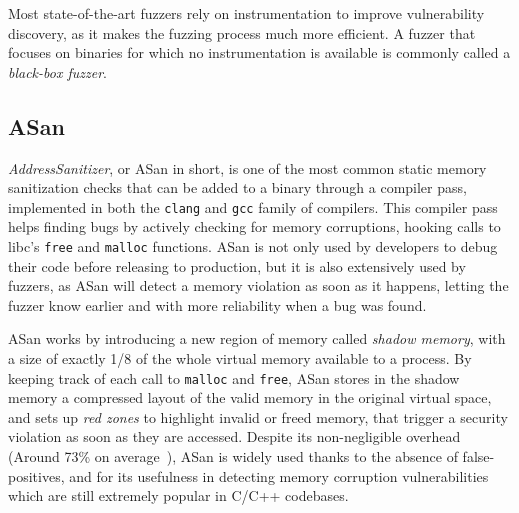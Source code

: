 \documentclass[a4paper,11pt,oneside]{report}
\begin{document}
Most state-of-the-art fuzzers rely on instrumentation to improve vulnerability 
discovery, as it makes the fuzzing process much more efficient. A fuzzer that 
focuses on binaries for which no instrumentation is available is commonly 
called a \emph{black-box fuzzer}. 

\subsection{ASan}
\emph{AddressSanitizer}, or ASan in short, is one of the most common static 
memory sanitization checks that can be added to a binary through a compiler 
pass, implemented in both the \texttt{clang} and \texttt{gcc} family of 
compilers. This compiler pass helps finding bugs by actively checking for 
memory corruptions, hooking calls to libc's  \texttt{free} and \texttt{malloc} 
functions. ASan is not only used by developers to debug their code before 
releasing to production, but it is also extensively used by fuzzers, as ASan 
will detect a memory violation as soon as it happens, letting the fuzzer know 
earlier and with more reliability when a bug was found. 

ASan works by introducing a new region of memory called \emph{shadow memory}, 
with a size of exactly 1/8 of the whole virtual memory available to a process.
By keeping track of each call to \texttt{malloc} and \texttt{free}, ASan stores 
in the shadow memory a compressed layout of the valid memory in the original 
virtual space, and sets up \emph{red zones} to highlight invalid or freed 
memory, that trigger a security violation as soon as they are accessed. Despite 
its non-negligible overhead (Around 73\% on average~\cite{asanoverhead}), ASan 
is widely used thanks to the absence of false-positives, and for its usefulness 
in detecting memory corruption vulnerabilities which are still extremely 
popular in C/C++ codebases.
\end{document}
